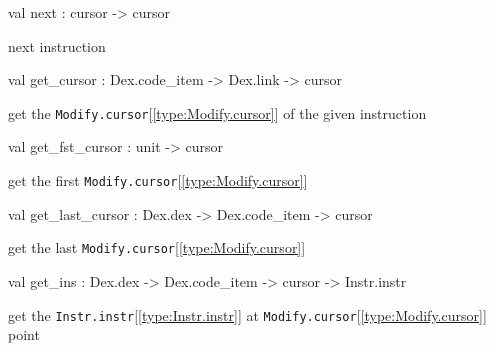 \documentclass[11pt]{article}
\begin{document}
\label{val:Modify.next}\begin{ocamldoccode}
val next : cursor -> cursor
\end{ocamldoccode}
\begin{ocamldocdescription}
next instruction


\end{ocamldocdescription}




\label{val:Modify.get-underscorecursor}\begin{ocamldoccode}
val get_cursor : Dex.code_item -> Dex.link -> cursor
\end{ocamldoccode}
\begin{ocamldocdescription}
get the {\tt{Modify.cursor}}[\ref{type:Modify.cursor}] of the given instruction


\end{ocamldocdescription}




\label{val:Modify.get-underscorefst-underscorecursor}\begin{ocamldoccode}
val get_fst_cursor : unit -> cursor
\end{ocamldoccode}
\begin{ocamldocdescription}
get the first {\tt{Modify.cursor}}[\ref{type:Modify.cursor}]


\end{ocamldocdescription}




\label{val:Modify.get-underscorelast-underscorecursor}\begin{ocamldoccode}
val get_last_cursor : Dex.dex -> Dex.code_item -> cursor
\end{ocamldoccode}
\begin{ocamldocdescription}
get the last {\tt{Modify.cursor}}[\ref{type:Modify.cursor}]


\end{ocamldocdescription}




\label{val:Modify.get-underscoreins}\begin{ocamldoccode}
val get_ins : Dex.dex -> Dex.code_item -> cursor -> Instr.instr
\end{ocamldoccode}
\begin{ocamldocdescription}
get the {\tt{Instr.instr}}[\ref{type:Instr.instr}] at {\tt{Modify.cursor}}[\ref{type:Modify.cursor}] point


\end{ocamldocdescription}
\end{document}
